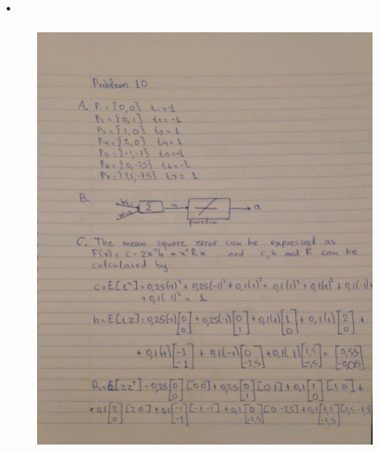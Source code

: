\documentclass{article}
\begin{document}
\section{.}
\begin{figure}[htp]
    \centering
    \includegraphics[width=11cm]{photos/10.jpg}
    \caption{}
    \label{}
\end{figure}
\end{document}
